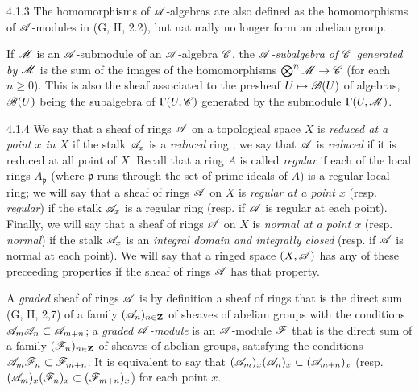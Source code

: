 \documentclass{book}
\begin{document}
\begin{env}{4.1.3}
The homomorphisms of $\mathscr{A}$-algebras are also defined as the homomorphisms of $\mathscr{A}$-modules
in (G, II, 2.2), but naturally no longer form an abelian group.

If $\mathscr{M}$ is an $\mathscr{A}$-submodule of an $\mathscr{A}$-algebra $\mathscr{C}$, the
\emph{$\mathscr{A}$-subalgebra of $\mathscr{C}$ generated by $\mathscr{M}$} is the sum of the images
of the homomorphisms $\bigotimes^n\mathscr{M}\to\mathscr{C}$ (for each $n\geq 0$). This is also the sheaf
associated to the presheaf $U\mapsto\mathscr{B}(U)$ of algebras, $\mathscr{B}(U)$ being the subalgebra
of $\Gamma(U,\mathscr{C})$ generated by the submodule $\Gamma(U,\mathscr{M})$.
\end{env}

\begin{env}{4.1.4}
\label{env-0.4.1.4}
We say that a sheaf of rings $\mathscr{A}$ on a topological space $X$ is \emph{reduced at a point $x$ in $X$}
if the stalk $\mathscr{A}_x$ is a \emph{reduced} ring ; we say that $\mathscr{A}$ is \emph{reduced}
if it is reduced at all point of $X$. Recall that a ring $A$ is called \emph{regular} if each of the local
rings $A_{\mathfrak{p}}$ (where $\mathfrak{p}$ runs through the set of prime ideals of $A$) is a regular local ring;
we will say that a sheaf of rings $\mathscr{A}$ on $X$ is \emph{regular at a point $x$} (resp. \emph{regular})
if the stalk $\mathscr{A}_x$ is a regular ring (resp. if $\mathscr{A}$ is regular at each point). Finally, we will
say that a sheaf of rings $\mathscr{A}$ on $X$ is \emph{normal at a point $x$} (resp. \emph{normal}) if the
stalk $\mathscr{A}_x$ is an \emph{integral domain and integrally closed} (resp. if $\mathscr{A}$ is normal at each
point). We will say that a ringed space $(X,\mathscr{A})$ has any of these preceeding properties if the sheaf
of rings $\mathscr{A}$ has that property.

A \emph{graded} sheaf of rings $\mathscr{A}$ is by definition a sheaf of rings that is the direct sum
(G, II, 2,7) of a family $(\mathscr{A}_n)_{n\in\mathbf{Z}}$ of sheaves of abelian groups with the conditions
$\mathscr{A}_m\mathscr{A}_n\subset\mathscr{A}_{m+n}$; a \emph{graded $\mathscr{A}$-module} is an $\mathscr{A}$-module
$\mathscr{F}$ that is the direct sum of a family $(\mathscr{F}_n)_{n\in\mathbf{Z}}$ of sheaves of abelian groups,
satisfying the conditions $\mathscr{A}_m\mathscr{F}_n\subset\mathscr{F}_{m+n}$. It is equivalent to say that
$(\mathscr{A}_m)_x(\mathscr{A}_n)_x\subset(\mathscr{A}_{m+n})_x$ (resp. $(\mathscr{A}_m)_x(\mathscr{F}_n)_x\subset(\mathscr{F}_{m+n})_x$)
for each point $x$.
\end{env}
\end{document}
